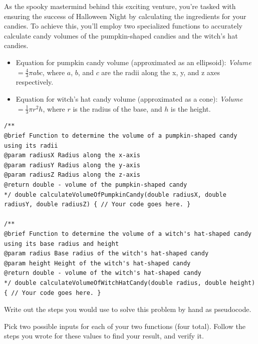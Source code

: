 As the spooky mastermind behind this exciting venture, you're tasked with ensuring the success of Halloween Night by calculating the ingredients for your candies. To achieve this, you'll employ two specialized functions to accurately calculate candy volumes of the pumpkin-shaped candies and the witch's hat candies. 



\begin{itemize}
\item Equation for pumpkin candy volume (approximated as an ellipsoid): \textit{Volume} $= \frac{4}{3}\pi a b c$, where $a$, $b$, and $c$ are the radii along the x, y, and z axes respectively.
\item Equation for witch's hat candy volume (approximated as a cone): \textit{Volume} $= \frac{1}{3}\pi r^2 h$, where $r$ is the radius of the base, and $h$ is the height.
\end{itemize}


\begin{verbatim}
/**
@brief Function to determine the volume of a pumpkin-shaped candy using its radii
@param radiusX Radius along the x-axis
@param radiusY Radius along the y-axis
@param radiusZ Radius along the z-axis
@return double - volume of the pumpkin-shaped candy
*/ double calculateVolumeOfPumpkinCandy(double radiusX, double radiusY, double radiusZ) { // Your code goes here. }

/**
@brief Function to determine the volume of a witch's hat-shaped candy using its base radius and height
@param radius Base radius of the witch's hat-shaped candy
@param height Height of the witch's hat-shaped candy
@return double - volume of the witch's hat-shaped candy
*/ double calculateVolumeOfWitchHatCandy(double radius, double height) { // Your code goes here. }
\end{verbatim}

\begin{multipart}
    Write out the steps you would use to solve this problem by hand as pseudocode. 
\end{multipart}

\newpage

\begin{multipart}
    Pick two possible inputs for each of your two functions (four total). Follow the steps you wrote for these values to find your result, and verify it.
\end{multipart}

